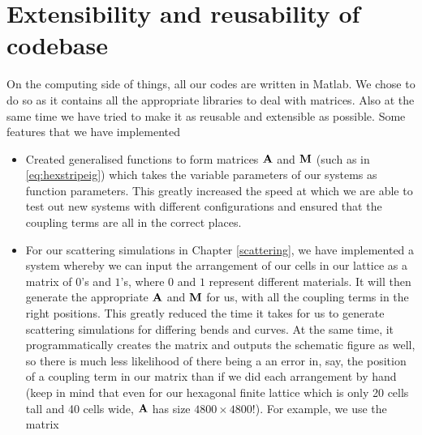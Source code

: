 \section{Extensibility and reusability of codebase}
On the computing side of things, all our codes are written in Matlab. We chose
to do so as it contains all the appropriate libraries to deal with matrices.
Also at the same time we have tried to make it as reusable and extensible as
possible. Some features that we have implemented

\begin{itemize}
\item Created generalised functions to form matrices $\mathbf{A}$ and $\mathbf{M}$
(such as in \eqref{eq:hexstripeig}) which takes the variable parameters of our
systems as function parameters. This greatly increased the speed at which we
are able to test out new systems with different configurations and ensured that the coupling terms are all in the correct places. 
\item For our scattering simulations in Chapter \ref{scattering}, we have
implemented a system whereby we can input the arrangement of our cells in our
lattice as a matrix of $0$'s and $1$'s, where $0$ and $1$ represent different
materials. It will then generate the appropriate $\mathbf{A}$ and $\mathbf{M}$ for
us, with all the coupling terms in the right positions. This greatly reduced
the time it takes for us to generate scattering simulations for differing bends
and curves. At the same time, it programmatically creates the matrix and
outputs the schematic figure as well, so there is much less likelihood of there
being a an error in, say, the position of a coupling term in our matrix than if
we did each arrangement by hand (keep in mind that even for our hexagonal
finite lattice which is only 20 cells tall and 40 cells wide, $\mathbf{A}$ has
size $4800\times 4800$!). For example, we use the matrix


\end{itemize}
